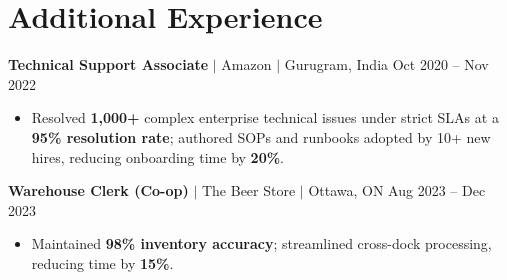 \documentclass[11pt,a4paper]{article}
\begin{document}
\section{Additional Experience}

\textbf{Technical Support Associate} $|$ Amazon $|$ Gurugram, India \hfill Oct 2020 -- Nov 2022
\begin{itemize}
    \item Resolved \textbf{1,000+} complex enterprise technical issues under strict SLAs at a \textbf{95\% resolution rate}; authored SOPs and runbooks adopted by 10+ new hires, reducing onboarding time by \textbf{20\%}.
\end{itemize}

\vspace{4pt}

\textbf{Warehouse Clerk (Co-op)} $|$ The Beer Store $|$ Ottawa, ON \hfill Aug 2023 -- Dec 2023
\begin{itemize}
    \item Maintained \textbf{98\% inventory accuracy}; streamlined cross-dock processing, reducing time by \textbf{15\%}.
\end{itemize}
\end{document}
